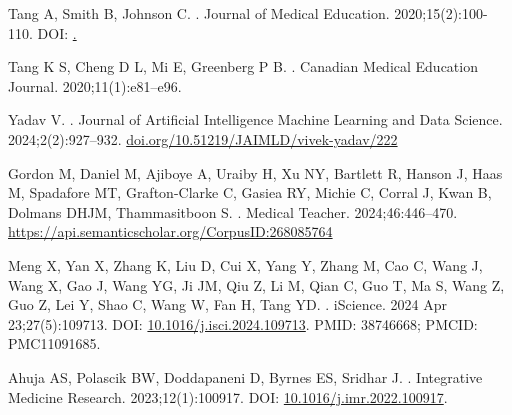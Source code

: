 \documentclass[10pt,letterpaper]{article}
\begin{document}
%
%
% 
\begin{thebibliography}{10}

Tang A, Smith B, Johnson C.
.
\newblock Journal of Medical Education. 2020;15(2):100-110.
\newblock DOI: \href{https://doi.org/10.1234/jme.2020.12345}.

Tang K S, Cheng D L, Mi E, Greenberg P B.
.
\newblock Canadian Medical Education Journal. 2020;11(1):e81--e96. 

Yadav V.
.
\newblock Journal of Artificial Intelligence Machine Learning and Data Science. 2024;2(2):927--932. \url{doi.org/10.51219/JAIMLD/vivek-yadav/222} 

Gordon M, Daniel M, Ajiboye A, Uraiby H, Xu NY, Bartlett R, Hanson J, Haas M, Spadafore MT, Grafton-Clarke C, Gasiea RY, Michie C, Corral J, Kwan B, Dolmans DHJM, Thammasitboon S.
.
\newblock Medical Teacher. 2024;46:446--470. \url{https://api.semanticscholar.org/CorpusID:268085764}

Meng X, Yan X, Zhang K, Liu D, Cui X, Yang Y, Zhang M, Cao C, Wang J, Wang X, Gao J, Wang YG, Ji JM, Qiu Z, Li M, Qian C, Guo T, Ma S, Wang Z, Guo Z, Lei Y, Shao C, Wang W, Fan H, Tang YD.
.
\newblock iScience. 2024 Apr 23;27(5):109713.
\newblock DOI: \href{https://doi.org/10.1016/j.isci.2024.109713}{10.1016/j.isci.2024.109713}.
\newblock PMID: 38746668; PMCID: PMC11091685.

Ahuja AS, Polascik BW, Doddapaneni D, Byrnes ES, Sridhar J.
.
\newblock Integrative Medicine Research. 2023;12(1):100917.
\newblock DOI: \href{https://doi.org/10.1016/j.imr.2022.100917}{10.1016/j.imr.2022.100917}.


\end{thebibliography}
\end{document}
